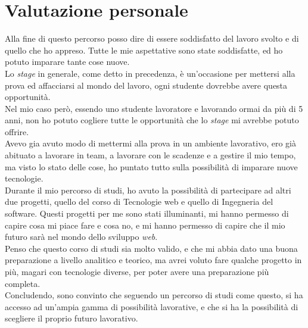 \section{Valutazione personale}
Alla fine di questo percorso posso dire di essere soddisfatto del lavoro svolto e di quello che ho appreso.
Tutte le mie aspettative sono state soddisfatte, ed ho potuto imparare tante cose nuove.\\
Lo \textit{stage} in generale, come detto in precedenza, è un'occasione per mettersi alla prova ed affacciarsi al mondo del lavoro,
ogni studente dovrebbe avere questa opportunità.\\
Nel mio caso però, essendo uno studente lavoratore e lavorando ormai da più di 5 anni, non ho potuto cogliere tutte 
le opportunità che lo \textit{stage} mi avrebbe potuto offrire.\\
Avevo gia avuto modo di mettermi alla prova in un ambiente lavorativo, ero già abituato a lavorare in team, a lavorare
con le scadenze e a gestire il mio tempo, ma visto lo stato delle cose, 
ho puntato tutto sulla possibilità di imparare nuove tecnologie.\\
Durante il mio percorso di studi, ho avuto la possibilità di partecipare ad altri due progetti, quello del corso di 
Tecnologie web e quello di Ingegneria del software. Questi progetti per me sono stati illuminanti, mi hanno
permesso di capire cosa mi piace fare e cosa no, e mi hanno permesso di capire che il mio futuro sarà nel mondo dello sviluppo \textit{web}.\\
Penso che questo corso di studi sia molto valido, e che mi abbia dato una buona preparazione a livello analitico e teorico, ma
avrei voluto fare qualche progetto in più, magari con tecnologie diverse, per poter avere una preparazione più completa.\\
Concludendo, sono convinto che seguendo un percorso di studi come questo, si ha accesso ad un'ampia gamma di possibilità lavorative,
e che si ha la possibilità di scegliere il proprio futuro lavorativo.